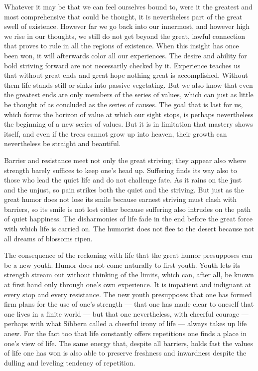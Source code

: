 \documentclass[12pt]{book}
\newcommand{\opage}[1]{\marginnote{\footnotesize\textit{[#1]}}}
\begin{document}
Whatever it may be that we can feel ourselves bound to, were it the greatest and most
comprehensive that could be thought, it is nevertheless part of the great swell of
existence. However far we go back into our innermost, and however high we rise in our
thoughts, we still do not get beyond the great, lawful connection that proves to rule in
all the regions of existence. When this insight has once been won, it will afterwards
color all our experiences. The desire and ability for bold striving forward are not
necessarily checked by it. Experience teaches us that without great ends and great hope
nothing great is accomplished. Without them life stands still or sinks into passive
vegetating. But we also know that even the greatest ends are only members of the series
of values, which can just as little be thought of as concluded as the series of causes.
The goal that is last for us, which forms the horizon of value at which our sight stops,
is perhaps nevertheless the beginning of a new series of values. But it is in
limitation that mastery shows itself, and even if the trees cannot grow up into heaven,
their growth can nevertheless be straight and beautiful.

\opage{87}Barrier and resistance meet not only the great striving; they appear also
where strength barely suffices to keep one's head up. Suffering finds its way also to
those who lead the quiet life and do not challenge fate. As it rains on the just and the
unjust, so pain strikes both the quiet and the striving. But just as the great humor
does not lose its smile because earnest striving must clash with barriers, so its smile
is not lost either because suffering also intrudes on the path of quiet happiness. The
disharmonies of life fade in the end before the great force with which life is carried
on. The humorist does not flee to the desert because not all dreams of blossoms ripen.

The consequence of the reckoning with life that the great humor presupposes can be a
new youth. Humor does not come naturally to first youth. Youth lets its strength stream
out without thinking of the limits, which can, after all, be known at first hand only
through one's own experience. It is impatient and indignant at every stop and every
resistance. The new youth presupposes that one has formed firm plans for the use of
one's strength --- that one has made clear to oneself that one lives in a finite world
--- but that one nevertheless, with cheerful courage --- perhaps with what Sibbern
called a cheerful irony of life --- always takes up life anew. For the fact too that
life constantly offers repetitions one finds a place in one's view of life. The same
energy that, despite all barriers, holds fast the values of life one has won is also
able to
preserve freshness and inwardness despite the dulling and leveling tendency of
repetition.
\end{document}
